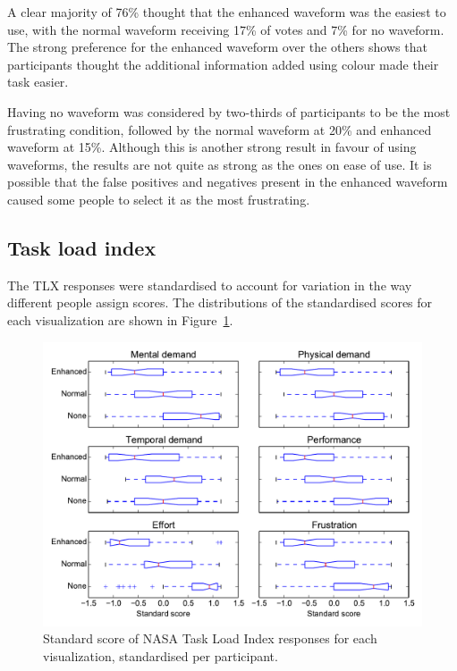 A clear majority of 76\% thought that the enhanced waveform was the easiest to
use, with the normal waveform receiving 17\% of votes and 7\% for no waveform.
The strong preference for the enhanced waveform over the others shows that
participants thought the additional information added using colour made their
task easier.

Having no waveform was considered by two-thirds of participants to be the most
frustrating condition, followed by the normal waveform at 20\% and enhanced
waveform at 15\%. Although this is another strong result in favour of using
waveforms, the results are not quite as strong as the ones on ease of
use. It is possible that the false positives and negatives present in the
enhanced waveform caused some people to select it as the most frustrating.

\subsection{Task load index}
The TLX responses were standardised to account for variation in the way
different people assign scores. The distributions of the standardised scores
for each visualization are shown in Figure~\ref{fig:tlx}.

\begin{figure}[p]
  \centering
  \includegraphics[width=\textwidth]{figs/tlx-std.pdf}
  \caption{Standard score of NASA Task Load Index responses for each
    visualization, standardised per participant.}
  \label{fig:tlx}
\end{figure}

